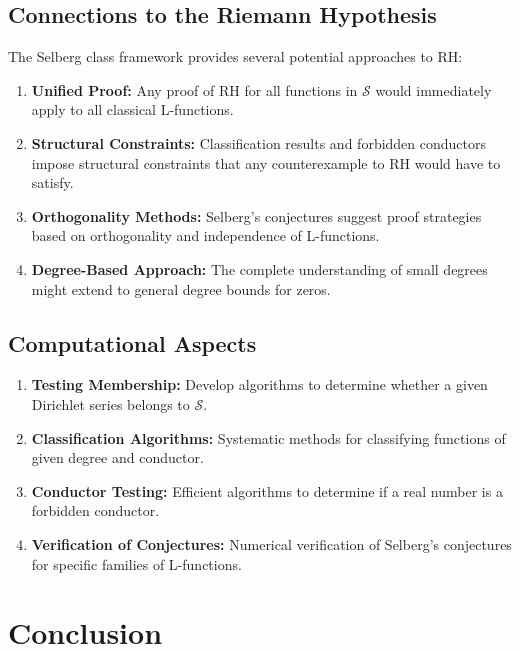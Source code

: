 \subsection{Connections to the Riemann Hypothesis}

The Selberg class framework provides several potential approaches to RH:

\begin{enumerate}
\item \textbf{Unified Proof:} Any proof of RH for all functions in $\mathcal{S}$ would immediately apply to all classical L-functions.

\item \textbf{Structural Constraints:} Classification results and forbidden conductors impose structural constraints that any counterexample to RH would have to satisfy.

\item \textbf{Orthogonality Methods:} Selberg's conjectures suggest proof strategies based on orthogonality and independence of L-functions.

\item \textbf{Degree-Based Approach:} The complete understanding of small degrees might extend to general degree bounds for zeros.
\end{enumerate}

\subsection{Computational Aspects}

\begin{enumerate}
\item \textbf{Testing Membership:} Develop algorithms to determine whether a given Dirichlet series belongs to $\mathcal{S}$.

\item \textbf{Classification Algorithms:} Systematic methods for classifying functions of given degree and conductor.

\item \textbf{Conductor Testing:} Efficient algorithms to determine if a real number is a forbidden conductor.

\item \textbf{Verification of Conjectures:} Numerical verification of Selberg's conjectures for specific families of L-functions.
\end{enumerate}

\section{Conclusion}

